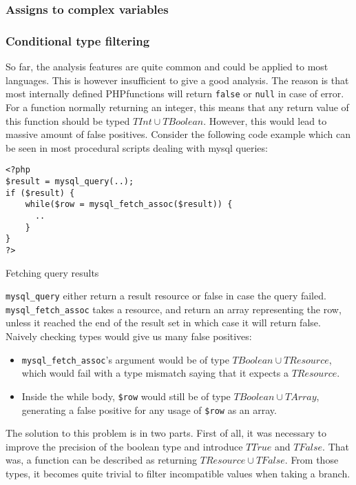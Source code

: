 \documentclass[a4paper]{article}
\begin{document}
\subsubsection{Assigns to complex variables}

\subsubsection{Conditional type filtering}
So far, the analysis features are quite common and could be applied to most
languages. This is however insufficient to give a good analysis. The reason is
that most internally defined PHPfunctions will return \verb/false/ or
\verb/null/ in case of error. For a function normally returning an integer,
this means that any return value of this function should be typed
$TInt \cup TBoolean$. However, this would lead to massive amount of false
positives. Consider the following code example which can be seen in most
procedural scripts dealing with mysql queries:

\begin{listing}
  \begin{verbatim}
<?php
$result = mysql_query(..);
if ($result) {
    while($row = mysql_fetch_assoc($result)) {
      ..
    }
}
?>
  \end{verbatim}
  \caption{Fetching query results}
\end{listing}

\verb/mysql_query/ either return a result resource or false in case the query
failed. \verb/mysql_fetch_assoc/ takes a resource, and return an array
representing the row, unless it reached the end of the result set in which case
it will return false. Naively checking types would give us many false
positives:
\begin{itemize}
  \item \verb/mysql_fetch_assoc/'s argument would be of type
    $TBoolean \cup TResource$, which would fail with a type mismatch saying
    that it expects a $TResource$.
  \item Inside the while body, \verb/$row/ would still be of type $TBoolean
    \cup TArray$, generating a false positive for any usage of \verb/$row/ as
    an array.
\end{itemize}

The solution to this problem is in two parts. First of all, it was necessary to
improve the precision of the boolean type and introduce $TTrue$ and $TFalse$.
That was, a function can be described as returning $TResource \cup TFalse$.
From those types, it becomes quite trivial to filter incompatible values when
taking a branch.
\end{document}
